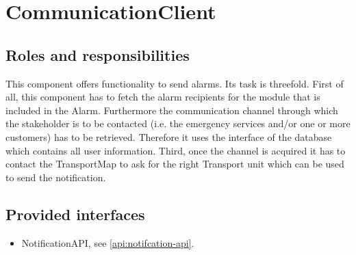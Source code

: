 \section{CommunicationClient}
\label{element:communication-client}

\subsection{Roles and responsibilities}

\npar This component offers functionality to send alarms. Its task is
threefold. First of all, this component has to fetch the alarm recipients for
the module that is included in the Alarm. Furthermore the communication channel
through which the stakeholder is to be contacted (i.e. the emergency services and/or one
or more customers) has to be retrieved. Therefore it uses the
 interface of the database which contains all user
information. Third, once the channel is acquired it has to contact the
TransportMap to ask for the right Transport unit which can be used to send the
notification.

\subsection{Provided interfaces}

\begin{itemize}
  \item NotificationAPI, see \ref{api:notifcation-api}.
\end{itemize}